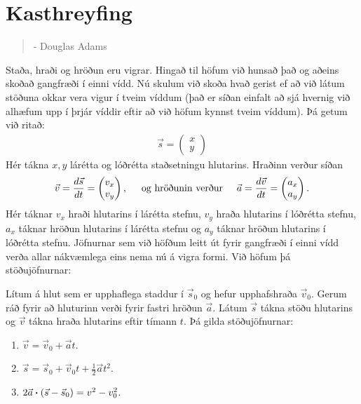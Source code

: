 
\chapter{Kasthreyfing}

\begin{quote}
    \textit{}
    \begin{flushright}
    - Douglas Adams
    \end{flushright}
\end{quote}

Staða, hraði og hröðun eru vigrar. Hingað til höfum við hunsað það og aðeins skoðað gangfræði í einni vídd. Nú skulum við skoða hvað gerist ef að við látum stöðuna okkar vera vigur í tveim víddum (það er síðan einfalt að sjá hvernig við alhæfum upp í þrjár víddir eftir að við höfum kynnst tveim víddum). Þá getum við ritað:
\begin{align*}
\vec{s} = \begin{pmatrix}
x \\
y
\end{pmatrix}
\end{align*}
Hér tákna $x,y$ lárétta og lóðrétta staðsetningu hlutarins. Hraðinn verður síðan
\begin{align*}
\vec{v} = \frac{d\vec{s}}{dt} = \begin{pmatrix}
v_x \\
v_y
\end{pmatrix}, \hspace{0.5cm} \text{og hröðunin verður} \hspace{0.5cm} \vec{a} = \frac{d\vec{v}}{dt} = \begin{pmatrix}
a_x \\
a_y
\end{pmatrix}.
\end{align*}
Hér táknar $v_x$ hraði hlutarins í lárétta stefnu, $v_y$ hraða hlutarins í lóðrétta stefnu, $a_x$ táknar hröðun hlutarins í lárétta stefnu og $a_y$ táknar hröðun hlutarins í lóðrétta stefnu. Jöfnurnar sem við höfðum leitt út fyrir gangfræði í einni vídd verða allar nákvæmlega eins nema nú á vigra formi. Við höfum þá stöðujöfnurnar:

\begin{tcolorbox}
\begin{theorem}
Lítum á hlut sem er upphaflega staddur í $\vec{s}_0$ og hefur upphafshraða $\vec{v}_0$. Gerum ráð fyrir að hluturinn verði fyrir fastri hröðun $\vec{a}$. Látum $\vec{s}$ tákna stöðu hlutarins og $\vec{v}$ tákna hraða hlutarins eftir tímann $t$. Þá gilda stöðujöfnurnar:

\begin{enumerate}[label = \textbf{(\roman*)}]
    \item $\vec{v} = \vec{v}_0 + \vec{a}t$.

    \item $\vec{s} = \vec{s}_0 + \vec{v}_0 t + \frac{1}{2}\vec{a}t^2$.
    
    \item $2\vec{a} \vdot (\vec{s} - \vec{s}_0) = v^2 - v_0^2$.
\end{enumerate}
\end{theorem}
\end{tcolorbox}

